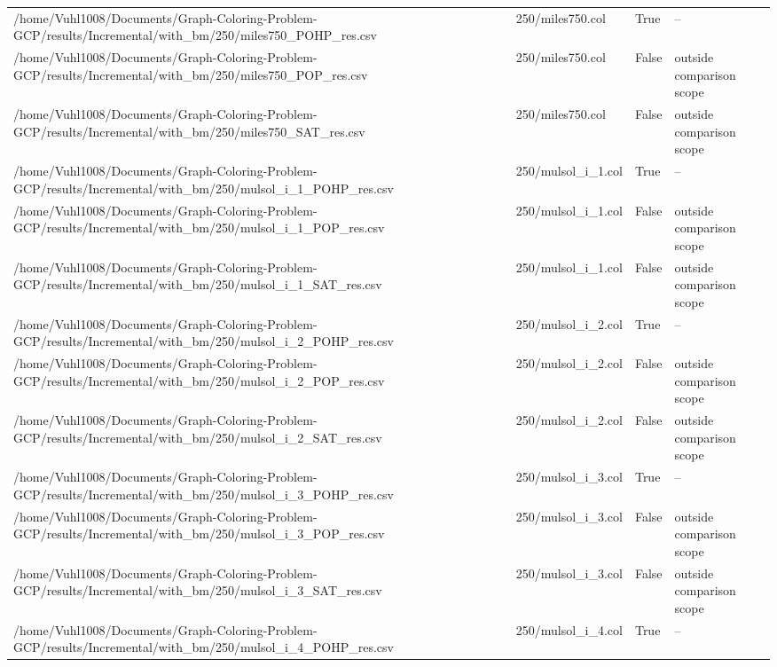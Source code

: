 \begin{table}[htbp]
\begin{tabular}{llll}
/home/Vuhl1008/Documents/Graph-Coloring-Problem-GCP/results/Incremental/with\_bm/250/miles750\_POHP\_res.csv & 250/miles750.col & True & -- \\
/home/Vuhl1008/Documents/Graph-Coloring-Problem-GCP/results/Incremental/with\_bm/250/miles750\_POP\_res.csv & 250/miles750.col & False & outside comparison scope \\
/home/Vuhl1008/Documents/Graph-Coloring-Problem-GCP/results/Incremental/with\_bm/250/miles750\_SAT\_res.csv & 250/miles750.col & False & outside comparison scope \\
/home/Vuhl1008/Documents/Graph-Coloring-Problem-GCP/results/Incremental/with\_bm/250/mulsol\_i\_1\_POHP\_res.csv & 250/mulsol\_i\_1.col & True & -- \\
/home/Vuhl1008/Documents/Graph-Coloring-Problem-GCP/results/Incremental/with\_bm/250/mulsol\_i\_1\_POP\_res.csv & 250/mulsol\_i\_1.col & False & outside comparison scope \\
/home/Vuhl1008/Documents/Graph-Coloring-Problem-GCP/results/Incremental/with\_bm/250/mulsol\_i\_1\_SAT\_res.csv & 250/mulsol\_i\_1.col & False & outside comparison scope \\
/home/Vuhl1008/Documents/Graph-Coloring-Problem-GCP/results/Incremental/with\_bm/250/mulsol\_i\_2\_POHP\_res.csv & 250/mulsol\_i\_2.col & True & -- \\
/home/Vuhl1008/Documents/Graph-Coloring-Problem-GCP/results/Incremental/with\_bm/250/mulsol\_i\_2\_POP\_res.csv & 250/mulsol\_i\_2.col & False & outside comparison scope \\
/home/Vuhl1008/Documents/Graph-Coloring-Problem-GCP/results/Incremental/with\_bm/250/mulsol\_i\_2\_SAT\_res.csv & 250/mulsol\_i\_2.col & False & outside comparison scope \\
/home/Vuhl1008/Documents/Graph-Coloring-Problem-GCP/results/Incremental/with\_bm/250/mulsol\_i\_3\_POHP\_res.csv & 250/mulsol\_i\_3.col & True & -- \\
/home/Vuhl1008/Documents/Graph-Coloring-Problem-GCP/results/Incremental/with\_bm/250/mulsol\_i\_3\_POP\_res.csv & 250/mulsol\_i\_3.col & False & outside comparison scope \\
/home/Vuhl1008/Documents/Graph-Coloring-Problem-GCP/results/Incremental/with\_bm/250/mulsol\_i\_3\_SAT\_res.csv & 250/mulsol\_i\_3.col & False & outside comparison scope \\
/home/Vuhl1008/Documents/Graph-Coloring-Problem-GCP/results/Incremental/with\_bm/250/mulsol\_i\_4\_POHP\_res.csv & 250/mulsol\_i\_4.col & True & -- \\

\end{tabular}
\end{table}
